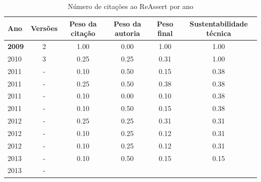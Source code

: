 \begin{table}[H]
\caption{Número de citações ao ReAssert por ano}
\centering
\begin{tabular}{| l | c | c | c | c | c |}
  \hline
  Ano & Versões & Peso da citação & Peso da autoria & Peso final & Sustentabilidade técnica \\
  \hline
            {\bf 2009}
          &
          2
          &
          1.00
          &
          0.00
          &
          1.00
          &
            {\color{blue} 1.00}
          \\
\hline
            2010
          &
          3
          &
          0.25
          &
          0.25
          &
          0.31
          &
            {\color{blue} 1.00}
          \\
\hline
            2011
          &
          -
          &
          0.10
          &
          0.50
          &
          0.15
          &
            {\color{red} 0.38}
          \\
            2011
          &
          -
          &
          0.25
          &
          0.50
          &
          0.38
          &
            {\color{red} 0.38}
          \\
            2011
          &
          -
          &
          0.10
          &
          0.00
          &
          0.10
          &
            {\color{red} 0.38}
          \\
            2011
          &
          -
          &
          0.10
          &
          0.50
          &
          0.15
          &
            {\color{red} 0.38}
          \\
\hline
            2012
          &
          -
          &
          0.25
          &
          0.25
          &
          0.31
          &
            {\color{red} 0.31}
          \\
            2012
          &
          -
          &
          0.10
          &
          0.25
          &
          0.12
          &
            {\color{red} 0.31}
          \\
            2012
          &
          -
          &
          0.10
          &
          0.25
          &
          0.12
          &
            {\color{red} 0.31}
          \\
\hline
            2013
          &
          -
          &
          0.10
          &
          0.50
          &
          0.15
          &
            {\color{red} 0.15}
          \\
            2013
          &
          -

\end{tabular}
\end{table}
